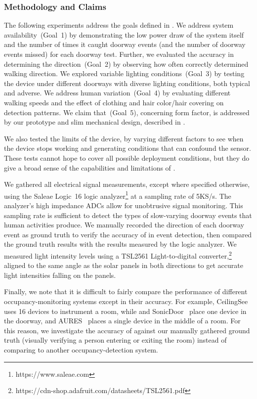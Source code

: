 \subsubsection{Methodology and Claims}
The following experiments address the goals defined in .
We address system availability~(Goal~1) by demonstrating the low power draw of the system itself and the number of times it caught doorway events (and the number of doorway events missed) for each doorway test.
Further, we evaluated the accuracy in determining the direction~(Goal~2) by observing how often \sysname correctly determined walking direction.
We explored variable lighting conditions~(Goal~3) by testing the device under \numDoors different doorways with diverse lighting conditions, both typical and adverse.
We address human variation~(Goal~4) by evaluating different walking speeds and the effect of clothing and hair color/hair covering on detection patterns.
We claim that~(Goal~5), concerning form factor, is addressed by our prototype and slim mechanical design, described in .

We also tested the limits of the device, by varying different factors to see when the device stops working and generating conditions that can confound the sensor.
These tests cannot hope to cover all possible deployment conditions, but they do give a broad sense of the capabilities and limitations of \sysname.

We gathered all electrical signal measurements, except where specified otherwise, using the Saleae Logic~16 logic analyzer\footnote{https://www.saleae.com} at a sampling rate of 5KS/s.
The analyzer's high impedance ADCs allow for unobtrusive signal monitoring.
This sampling rate is sufficient to detect the types of slow-varying doorway events that human activities produce.
We manually recorded the direction of each doorway event as ground truth to verify the accuracy of \sysname in event detection, then compared the ground truth results with the results measured by the logic analyzer.
We measured light intensity levels using a TSL2561 Light-to-digital converter,\footnote{https://cdn-shop.adafruit.com/datasheets/TSL2561.pdf}
aligned to the same angle as the solar panels in both directions to get accurate light intensities falling on the panels.

Finally, we note that it is difficult to fairly compare the performance of different occupancy-monitoring systems except in their accuracy. For example, CeilingSee~\cite{yang2017ceilingsee} uses 16 devices to instrument a room, while \sysname and SonicDoor~\cite{sonicdoor-buildsys2017} place one device in the doorway, and AURES~\cite{shih2016aures} places a single device in the middle of a room. 
For this reason, we investigate the accuracy of \sysname against our manually gathered ground truth (visually verifying a person entering or exiting the room) instead of comparing to another occupancy-detection system.

